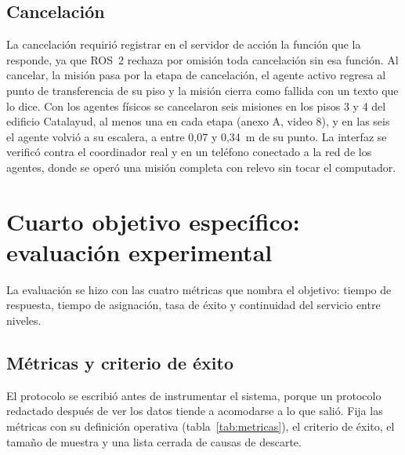\subsection{Cancelación}

La cancelación requirió registrar en el servidor de acción la función que la responde, ya que ROS~2 rechaza por omisión toda cancelación sin esa función. Al cancelar, la misión pasa por la etapa de cancelación, el agente activo regresa al punto de transferencia de su piso y la misión cierra como fallida con un texto que lo dice. Con los agentes físicos se cancelaron seis misiones en los pisos 3 y 4 del edificio Catalayud, al menos una en cada etapa (anexo A, video 8), y en las seis el agente volvió a su escalera, a entre 0,07 y 0,34~m de su punto. La interfaz se verificó contra el coordinador real y en un teléfono conectado a la red de los agentes, donde se operó una misión completa con relevo sin tocar el computador.

\section{Cuarto objetivo específico: evaluación experimental}
\label{sec:protocolo}

La evaluación se hizo con las cuatro métricas que nombra el objetivo: tiempo de respuesta, tiempo de asignación, tasa de éxito y continuidad del servicio entre niveles.

\subsection{Métricas y criterio de éxito}

El protocolo se escribió antes de instrumentar el sistema, porque un protocolo redactado después de ver los datos tiende a acomodarse a lo que salió. Fija las métricas con su definición operativa (tabla~\ref{tab:metricas}), el criterio de éxito, el tamaño de muestra y una lista cerrada de causas de descarte.


